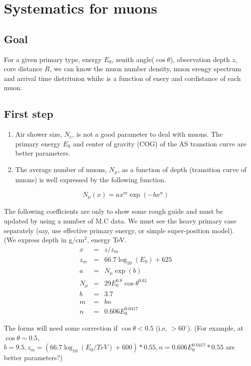 \documentclass[a4j]{jarticle}
\begin{document}
\section{Systematics for muons}


\subsection{Goal}
For a given primary type, energy $E_0$, zenith angle($\cos \theta$), 
  observation depth $z$, core distance $R$,
  we can know  the muon number density, muon erengy spectrum and arrival time
distrituion whihc is a function of enery and cordistance of each muon.

\subsection{First step}
\begin{enumerate}
\item  Air shower size, $N_e$, is not a good parameter to deal with
  muons.  The primary energy $E_0$ and center of gravity (COG) of the
  AS transtion curve are better parameters.

\item The average number of muons, $N_\mu$, as a function of depth
  (transition curve of muons) is well expressed  by the following
  function.
\end{enumerate}
\begin{equation}
 N_\mu(x) = a x^m  \exp(-b x^n)
\end{equation}

The following coefficients are only to show some rough guide and
must be  updated by using a number of M.C data.
We must see the heavy primary case separately (say, use effective
primary energy, or simple super-position model).
(We express depth in g/cm$^2$,  energy TeV.
\begin{eqnarray}
  x &= & z/z_m \\
  z_m &= & 66.7\log_{10}(E_0)+625 \\
  a &= &N_\mu \exp(b)\\
  N_\mu &= & 29 E_0^{0.8} \cos\theta^{0.61} \\
  b & = & 3.7 \\
  m &= & bn \\
  n &= &0.606E_0^{0.0417}
\end{eqnarray}

The forms  will need some correction if $\cos\theta<0.5$ (i.e, $>60^\circ$).
(For example, at $\cos\theta \sim 0.5$, $ b=9.5,
 z_m= ( 66.7\log_{10}(E_0/TeV) + 600) *0.55,
    n  =0.606E_0^{0.0417} * 0.55$ 
are better parameters?)
\end{document}
